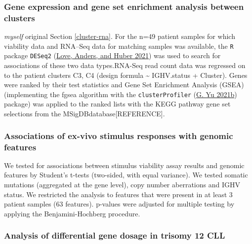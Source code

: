 \documentclass[11pt, a4paper, twosided]{book}
\begin{document}
\hypertarget{cluster-rna-method}{%
\subsubsection{Gene expression and gene set enrichment analysis between clusters}\label{cluster-rna-method}}

\emph{myself} original
Section \ref{cluster-rna}. For the n=49 patient samples for which viability data and RNA--Seq data for matching samples was available, the \texttt{R} package \texttt{DESeq2} (\protect\hyperlink{ref-R-DESeq2}{Love, Anders, and Huber 2021}) was used to search for associations of these two data types.RNA-Seq read count data was regressed on to the patient clusters C3, C4 (design formula \textasciitilde{} IGHV.status + Cluster). Genes were ranked by their test statistics and Gene Set Enrichment Analysis (GSEA) (implementing the fgsea algorithm with the \texttt{clusterProfiler} (\protect\hyperlink{ref-R-clusterProfiler}{G. Yu 2021b}) package) was applied to the ranked lists with the KEGG pathway gene set selections from the MSigDBdatabase{[}REFERENCE{]}.

\hypertarget{associations-of-ex-vivo-stimulus-responses-with-genomic-features}{%
\subsubsection{Associations of ex-vivo stimulus responses with genomic features}\label{associations-of-ex-vivo-stimulus-responses-with-genomic-features}}

We tested for associations between stimulus viability assay results and genomic features by Student's t-tests (two-sided, with equal variance). We tested somatic mutations (aggregated at the gene level), copy number aberrations and IGHV status. We restricted the analysis to features that were present in at least 3 patient samples (63 features). p-values were adjusted for multiple testing by applying the Benjamini-Hochberg procedure.

\hypertarget{gene-dosage-effects-method}{%
\subsubsection{Analysis of differential gene dosage in trisomy 12 CLL}\label{gene-dosage-effects-method}}
\end{document}
